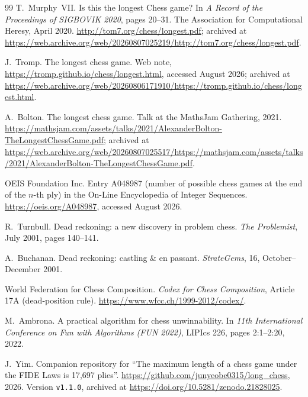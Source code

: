 \documentclass[11pt]{article}
\theoremstyle{definition}
\theoremstyle{remark}
\theoremstyle{plain}
\begin{document}
\begin{thebibliography}{99}
T.~Murphy~VII.
\newblock Is this the longest Chess game?
\newblock In \emph{A Record of the Proceedings of SIGBOVIK 2020}, pages
  20--31. The Association for Computational Heresy, April 2020.
\newblock \url{http://tom7.org/chess/longest.pdf}; archived at
  \url{https://web.archive.org/web/20260807025219/http://tom7.org/chess/longest.pdf}.

J.~Tromp.
\newblock The longest chess game.
\newblock Web note, \url{https://tromp.github.io/chess/longest.html},
  accessed August 2026; archived at
  \url{https://web.archive.org/web/20260806171910/https://tromp.github.io/chess/longest.html}.

A.~Bolton.
\newblock The longest chess game.
\newblock Talk at the MathsJam Gathering, 2021.
\newblock \url{https://mathsjam.com/assets/talks/2021/AlexanderBolton-TheLongestChessGame.pdf};
  archived at
  \url{https://web.archive.org/web/20260807025517/https://mathsjam.com/assets/talks/2021/AlexanderBolton-TheLongestChessGame.pdf}.

OEIS Foundation Inc.
\newblock Entry A048987 (number of possible chess games at the end of
  the $n$-th ply) in the On-Line Encyclopedia of Integer Sequences.
\newblock \url{https://oeis.org/A048987}, accessed August 2026.

R.~Turnbull.
\newblock Dead reckoning: a new discovery in problem chess.
\newblock \emph{The Problemist}, July 2001, pages 140--141.

A.~Buchanan.
\newblock Dead reckoning: castling \& en passant.
\newblock \emph{StrateGems}, 16, October--December 2001.

World Federation for Chess Composition.
\newblock \emph{Codex for Chess Composition}, Article 17A (dead-position
  rule).
\newblock \url{https://www.wfcc.ch/1999-2012/codex/}.

M.~Ambrona.
\newblock A practical algorithm for chess unwinnability.
\newblock In \emph{11th International Conference on Fun with Algorithms
  (FUN 2022)}, LIPIcs 226, pages 2:1--2:20, 2022.

J.~Yim.
\newblock Companion repository for ``The maximum length of a chess game
  under the FIDE Laws is 17,697 plies''.
\newblock \url{https://github.com/junyeobe0315/long_chess}, 2026.
\newblock Version \texttt{v1.1.0}, archived at
  \url{https://doi.org/10.5281/zenodo.21828025}.


\end{thebibliography}
\end{document}
